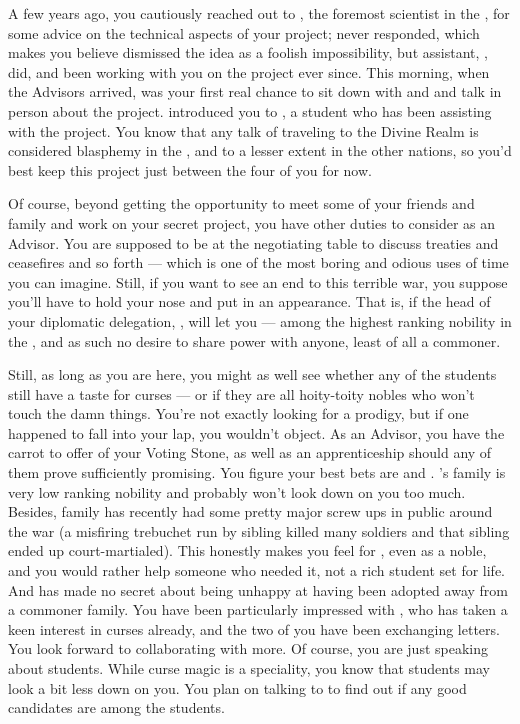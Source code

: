 \documentclass[char]{GL2020}
\begin{document}
A few years ago, you cautiously reached out to \cHeadScientist{\full}, the foremost scientist in the \pTech{}, for some advice on the technical aspects of your project; \cHeadScientist{\they} never responded, which makes you believe \cHeadScientist{\they} dismissed the idea as a foolish impossibility, but \cHeadScientist{\their} assistant, \cAssistantScientist{\full}, did, and \cAssistantScientist{\theyhave} been working with you on the project ever since. This morning, when the Advisors arrived, was your first real chance to sit down with \cFlowPriest{} and \cAssistantScientist{} and talk in person about the project. \cFlowPriest{\They} introduced you to \cAmbition{\intro}, a student who has been assisting \cFlowPriest{\them} with the project. You know that any talk of traveling to the Divine Realm is considered blasphemy in the \pFarm{}, and to a lesser extent in the other nations, so you'd best keep this project just between the four of you for now.

Of course, beyond getting the opportunity to meet some of your friends and family and work on your secret project, you have other duties to consider as an Advisor. You are supposed to be at the negotiating table to discuss treaties and ceasefires and so forth — which is one of the most boring and odious uses of time you can imagine. Still, if you want to see an end to this terrible war, you suppose you'll have to hold your nose and put in an appearance. That is, if the head of your diplomatic delegation, \cEvil{\intro}, will let you — \cEvil{\theyare} among the highest ranking nobility in the \pFarm{}, and as such \cEvil{\have} no desire to share power with anyone, least of all a commoner. 

Still, as long as you are here, you might as well see whether any of the students still have a taste for curses — or if they are all hoity-toity nobles who won't touch the damn things. You're not exactly looking for a prodigy, but if one happened to fall into your lap, you wouldn't object. As an Advisor, you have the carrot to offer of your Voting Stone, as well as an apprenticeship should any of them prove sufficiently promising. You figure your best bets are \cLibAssist{\intro} and \cAdopted{\intro}. \cLibAssist{}'s family is very low ranking nobility and probably won't look down on you too much. Besides, \cLibAssist{\their} family has recently had some pretty major screw ups in public around the war (a misfiring trebuchet run by \cLibAssist{\their} sibling killed many soldiers and that sibling ended up court-martialed). This honestly makes you feel for \cLibAssist{\them}, even as a noble, and you would rather help someone who needed it, not a rich student set for life. And \cAdopted{} has made no secret about being unhappy at having been adopted away from a commoner family. You have been particularly impressed with \cAdopted{}, who has taken a keen interest in curses already, and the two of you have been exchanging letters. You look forward to collaborating with \cAdopted{\them} more. Of course, you are just speaking about \pFarm{} students. While curse magic is a \pFarm{} speciality, you know that \pTech{} students may look a bit less down on you. You plan on talking to \cAssistantScientist{} to find out if any good candidates are among the \pTech{} students.
\end{document}
